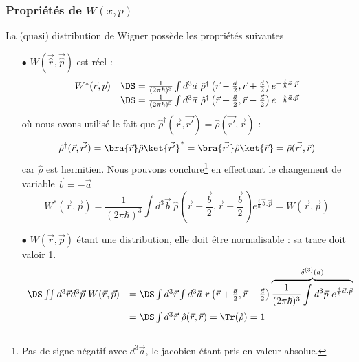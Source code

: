 \subsubsection{Propriétés de $W(x,p)$}
La (quasi) distribution de Wigner possède les propriétés suivantes
\begin{itemize}
\item[$\bullet$] $W(\vec \hat r,  \vec \hat p)$ est réel :
\begin{equation}
\begin{array}{ll}
W^*(\vec{r},\vec{p}) &\DS= \frac{1}{(2\pi\hbar)^3}\int d^3\vec{a}\ \hat{\rho}^\dagger\left(\vec{r}-\frac{\vec{a}}{2},\vec{r}
+\frac{\vec{a}}{2}\right)e^{-\frac{i}{\hbar}\vec{a}.\vec{p}}\\
&\DS= \frac{1}{(2\pi\hbar)^3}\int d^3\vec{a}\ \hat{\rho}^\dagger\left(\vec{r}+\frac{\vec{a}}{2},\vec{r}
-\frac{\vec{a}}{2}\right)e^{-\frac{i}{\hbar}\vec{a}.\vec{p}}
\end{array}
\end{equation}
où nous avons utilisé le fait que $\hat{\rho}^\dagger(\vec{r},\vec{r'}) = \hat{\rho}(\vec{r'},\vec{r})$ :
\begin{equation}
\hat{\rho}^\dagger(\vec{r},\vec{r'}) = \bra{\vec{r}}\hat{\rho}\ket{\vec{r'}}^*= \bra{\vec{r'}}\hat{\rho}\ket{\vec{r}} 
= \hat{\rho}(\vec{r'},\vec{r})
\end{equation}
car $\hat{\rho}$ est hermitien. Nous pouvons conclure\footnote{Pas de signe négatif avec $d^3\vec{a}$, le jacobien 
étant pris en valeur absolue.} en effectuant le changement de variable $\vec{b}=-\vec{a}$
\begin{equation}
W^*(\vec{r},\vec{p}) = \dfrac{1}{(2\pi\hbar)^3}\int d^3\vec{b}\ \hat\rho\left(\vec{r}-\frac{\vec{b}}{2},\vec{r}
+\frac{\vec{b}}{2}\right)e^{\frac{i}{\hbar}\vec{b}.\vec{p}} = W(\vec{r},\vec{p})
\end{equation}
\item[$\bullet$] $W(\vec{r},\vec{p})$ étant une distribution, elle doit être normalisable : sa trace doit valoir 1.
\begin{equation}
\begin{array}{ll}
\DS\iint d^3\vec{r}d^3\vec{p}\ W(\vec{r},\vec{p}) &=\DS \int d^3\vec{r}\int d^3\vec{a}\ r\left(\vec{r}+\frac{\vec{a}}{2},\vec{r}
-\frac{\vec{a}}{2}\right) \overbrace{\frac{1}{(2\pi\hbar)^3}\int d^3\vec{p}\ e^{\frac{i}{\hbar}\vec{a}.\vec{p}}}^{\delta^{(3)}(\vec{a})}\vspace{2mm}\\
&=\DS \int d^3\vec{r}\ \hat{\rho}(\vec{r},\vec{r}) = \Tr(\hat{\rho}) = 1

\end{array}
\end{equation}
\end{itemize}
